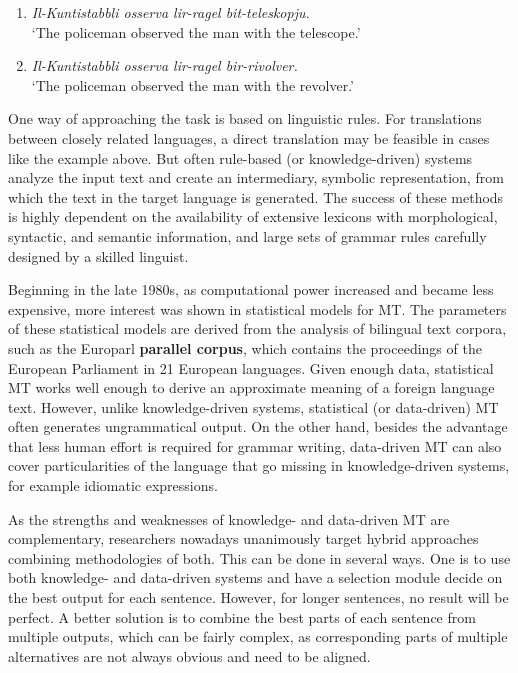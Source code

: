 \documentclass[]{../../metanetpaper}
\begin{document}
\begin{multicols}{2}
\begin{enumerate} %
\item \emph{Il-Kuntistabbli osserva lir-ragel bit-teleskopju.}\\
`The policeman observed the man with the telescope.'
\item \emph{Il-Kuntistabbli osserva lir-ragel bir-rivolver.}\\
`The policeman observed the man with the revolver.'
\end{enumerate}

One way of approaching the task is based on linguistic rules. For translations between closely related languages, a direct translation may be feasible in cases like the example above. But often rule-based (or knowledge-driven) systems analyze the input text and create an intermediary, symbolic representation, from which the text in the target language is generated. The success of these methods is highly dependent on the availability of extensive lexicons with morphological, syntactic, and semantic information, and large sets of grammar rules carefully designed by a skilled linguist.

Beginning in the late 1980s, as computational power increased and became less expensive, more interest was shown in statistical models for MT. The parameters of these statistical models are derived from the analysis of bilingual text corpora, such as the Europarl \textbf{parallel corpus}, which contains the proceedings of the European Parliament in 21 European languages. Given enough data, statistical MT works well enough to derive an approximate meaning of a foreign language text. However, unlike knowledge-driven systems, statistical (or data-driven) MT often generates ungrammatical output. On the other hand, besides the advantage that less human effort is required for grammar writing, data-driven MT can also cover particularities of the language that go missing in knowledge-driven systems, for example idiomatic expressions. 

As the strengths and weaknesses of knowledge- and data-driven MT are complementary, researchers nowadays unanimously target hybrid approaches combining methodologies of both. This can be done in several ways. One is to use both knowledge- and data-driven systems and have a selection module decide on the best output for each sentence. However, for longer sentences, no result will be perfect. A better solution is to combine the best parts of each sentence from multiple outputs, which can be fairly complex, as corresponding parts of multiple alternatives are not always obvious and need to be aligned. 


\end{multicols}
\end{document}
